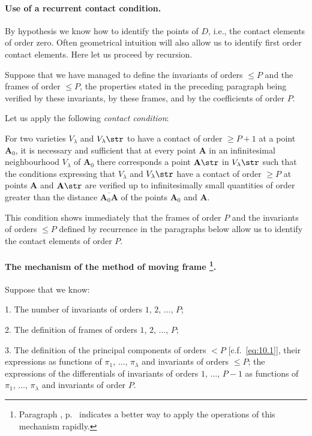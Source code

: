 \paragraph{Use of a recurrent contact condition.}
\label{sec:128}
By hypothesis we know how to identify the points of $D$, i.e., the contact elements of order zero. Often geometrical intuition will also allow us to identify first order contact elements. Here let us proceed by recursion.

Suppose that we have managed to define the invariants of orders $\le P$ and the frames of order $\le P$, the properties stated in the preceding paragraph being verified by these invariants, by these frames, and by the coefficients of order $P$.

Let us apply the following \emph{contact condition}:

\somespace

For two varieties $V_{\lambda}$ and $V_{\lambda}\str$ to have a contact of order $\ge P+1$ at a point $\mathbf{A}_{0}$, it is necessary and sufficient that at every point $\mathbf{A}$ in an infinitesimal neighbourhood $V_{\lambda}$ of $\mathbf{A}_{0}$ there corresponds a point $\mathbf{A}\str$ in $V_{\lambda}\str$ such that the conditions expressing that $V_{\lambda}$ and $V_{\lambda}\str$ have a contact of order $\ge P$ at points $\mathbf{A}$ and $\mathbf{A}\str$ are verified up to infinitesimally small quantities of order greater than the distance $\overline{\mathbf{A}_{0}\mathbf{A}}$ of the points $\mathbf{A}_{0}$ and $\mathbf{A}$.

This condition shows immediately that the frames of order $P$ and the invariants of orders $\le P$ defined by recurrence in the paragraphs below allow us to identify the contact elements of order $P$.


\paragraph[The mechanism of the method of moving frame.]{The mechanism of the method of moving frame \footnote{Paragraph , p.~\pageref{sec:172} indicates a better way to apply the operations of this mechanism rapidly.}.}
\label{sec:129}
Suppose that we know:

\somespace

1. The number of invariants of orders $1$, $2$, $\dots$, $P$;

2. The definition of frames of orders $1$, $2$, $\dots$, $P$;

3. The definition of the principal components of orders $<P$ [c.f.~\eqref{eq:10.1}], their expressions as functions of $\pi_{1}$, $\dots$, $\pi_{\lambda}$ and invariants of orders $\le P$; the expressions of the differentials of invariants of orders $1$, $\dots$, $P-1$ as functions of $\pi_{1}$, $\dots$, $\pi_{\lambda}$ and invariants of order $P$.

